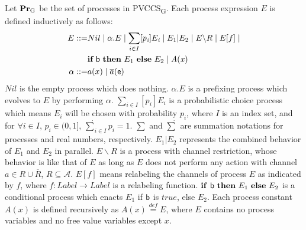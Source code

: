 \documentclass[10pt, conference, compsocconf]{IEEEtran}
\begin{document}
Let $\mathbf{Pr}\textsubscript{G}$ be the set of processes in PVCCS\textsubscript{G}. Each process expression $E$ is defined inductively as follows:
\begin{equation*}
\begin{aligned}
E::=&Nil\mid \alpha.E \mid\underset{i\in I}{\sum}[p_{\textit{i}}]E_{\textit{i}}\mid E_1|E_2\mid E\backslash R\mid E[f]\mid \\ &\textrm{{\bf if}}~{\sf b}~{\rm {\bf then}}~E_1~{\rm {\bf else}}~E_2
\mid {\it A(x)}\\
\alpha::=&a(x)\mid \overline{a}(\sf e)
\end{aligned}
\end{equation*}
$Nil$ is the empty process which does nothing.
$\alpha.E$ is a prefixing process which evolves to $E$ by performing $\alpha$.
$\underset{i\in I}{\sum}[p_{\textit{i}}]E_{\textit{i}}$ is a probabilistic choice process which means $E_{\textit{i}}$ will be chosen with probability $p_{\textit{i}}$, where $I$ is an index set, and for $\forall i\in I$, $p_{\textit{i}}\in (0,1]$, $\underset{i\in I}{\dot{\sum}}p_{\textit{i}}=1$. $\sum$ and $\dot{\sum}$ are summation notations for processes and real numbers, respectively.
$E_{1}|E_{2}$ represents the combined behavior of $E_{1}$ and $E_{2}$ in parallel.
$E\backslash R$ is a process with channel restriction, whose behavior is like that of $E$ as long as $E$ does not perform any action with channel $a\in R\cup \overline{R}$, $R\subseteq \mathcal{A}$.
$E[f]$ means relabeling the channels of process $E$ as indicated by $f$, where $f:Label\rightarrow Label$ is a relabeling function.
${\rm {\bf if}}~{\sf b}~{\rm {\bf then}}~E_1~{\rm {\bf else}}~E_2$ is a conditional process which enacts $E_{1}$ if ${\sf b}$ is $true$, else $E_{2}$.
Each process constant $A(x)$ is defined recursively as $A(x)\stackrel{\textit{def}}{=}E$, where $E$ contains no process variables and no free value variables except $x$.
\end{document}
